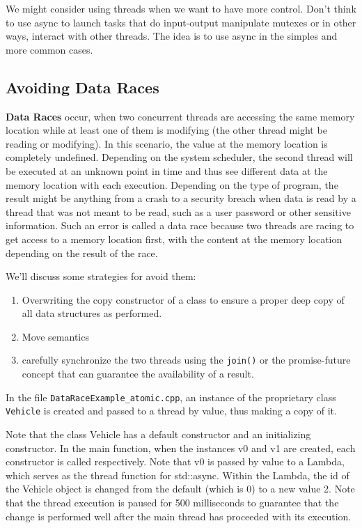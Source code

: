 \documentclass[11pt, a4paper]{article}
\begin{document}
We might consider using threads when we want to have more control. Don't think to use async to launch tasks that do input-output manipulate mutexes or in other ways, interact with other threads. The idea is to use async in the simples and more common cases. 



\subsection{Avoiding Data Races}%
\label{sub:avoiding_data_races}

\textbf{Data Races} occur, when two concurrent threads are accessing the same memory location while at least one of them is modifying (the other thread might be reading or modifying). In this scenario, the value at the memory location is completely undefined. Depending on the system scheduler, the second thread will be executed at an unknown point in time and thus see different data at the memory location with each execution. Depending on the type of program, the result might be anything from a crash to a security breach when data is read by a thread that was not meant to be read, such as a user password or other sensitive information. Such an error is called a data race because two threads are racing to get access to a memory location first, with the content at the memory location depending on the result of the race.




We'll discuss some strategies for avoid them:

\begin{enumerate}
	\item Overwriting the copy constructor of a class to ensure a proper deep copy of all data structures as performed.  
	\item Move semantics 
	\item carefully synchronize the two threads using the \texttt{join()} or the promise-future concept that can guarantee the availability of a result.
\end{enumerate}



In the file \texttt{DataRaceExample\_atomic.cpp}, an instance of the proprietary class \texttt{Vehicle} is created and passed to a thread by value, thus making a copy of it.

Note that the class Vehicle has a default constructor and an initializing constructor. In the main function, when the instances v0 and v1 are created, each constructor is called respectively. Note that v0 is passed by value to a Lambda, which serves as the thread function for std::async. Within the Lambda, the id of the Vehicle object is changed from the default (which is 0) to a new value 2. Note that the thread execution is paused for 500 milliseconds to guarantee that the change is performed well after the main thread has proceeded with its execution.
\end{document}
